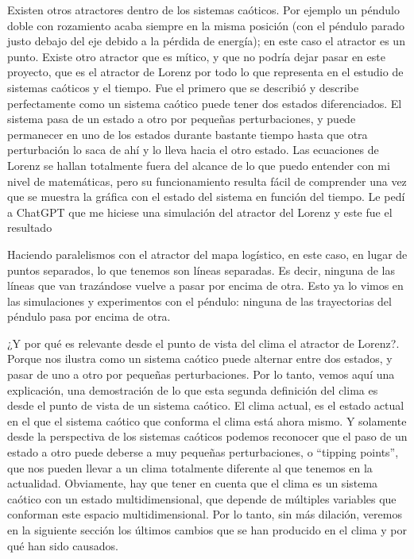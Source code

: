 \documentclass[
  10pt,
  a4paper,
  DIV=11,
  numbers=noendperiod,
  open=any]{scrreprt}
\numberwithin{equation}{chapter}
\numberwithin{equation}{chapter}
\renewcommand{\[}{\begin{equation}}
\renewcommand{\]}{\end{equation}}
\begin{document}
Existen otros atractores dentro de los sistemas caóticos. Por ejemplo un
péndulo doble con rozamiento acaba siempre en la misma posición (con el
péndulo parado justo debajo del eje debido a la pérdida de energía); en
este caso el atractor es un punto. Existe otro atractor que es mítico, y
que no podría dejar pasar en este proyecto, que es el atractor de Lorenz
por todo lo que representa en el estudio de sistemas caóticos y el
tiempo. Fue el primero que se describió y describe perfectamente como un
sistema caótico puede tener dos estados diferenciados. El sistema pasa
de un estado a otro por pequeñas perturbaciones, y puede permanecer en
uno de los estados durante bastante tiempo hasta que otra perturbación
lo saca de ahí y lo lleva hacia el otro estado. Las ecuaciones de Lorenz
se hallan totalmente fuera del alcance de lo que puedo entender con mi
nivel de matemáticas, pero su funcionamiento resulta fácil de comprender
una vez que se muestra la gráfica con el estado del sistema en función
del tiempo. Le pedí a ChatGPT que me hiciese una simulación del atractor
del Lorenz y este fue el resultado

Haciendo paralelismos con el atractor del mapa logístico, en este caso,
en lugar de puntos separados, lo que tenemos son líneas separadas. Es
decir, ninguna de las líneas que van trazándose vuelve a pasar por
encima de otra. Esto ya lo vimos en las simulaciones y experimentos con
el péndulo: ninguna de las trayectorias del péndulo pasa por encima de
otra.

¿Y por qué es relevante desde el punto de vista del clima el atractor de
Lorenz?. Porque nos ilustra como un sistema caótico puede alternar entre
dos estados, y pasar de uno a otro por pequeñas perturbaciones. Por lo
tanto, vemos aquí una explicación, una demostración de lo que esta
segunda definición del clima es desde el punto de vista de un sistema
caótico. El clima actual, es el estado actual en el que el sistema
caótico que conforma el clima está ahora mismo. Y solamente desde la
perspectiva de los sistemas caóticos podemos reconocer que el paso de un
estado a otro puede deberse a muy pequeñas perturbaciones, o ``tipping
points'', que nos pueden llevar a un clima totalmente diferente al que
tenemos en la actualidad. Obviamente, hay que tener en cuenta que el
clima es un sistema caótico con un estado multidimensional, que depende
de múltiples variables que conforman este espacio multidimensional. Por
lo tanto, sin más dilación, veremos en la siguiente sección los últimos
cambios que se han producido en el clima y por qué han sido causados.
\end{document}
